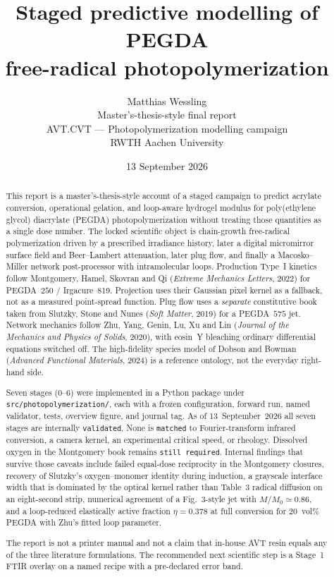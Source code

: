 \documentclass[11pt,a4paper,oneside]{report}
\title{Staged predictive modelling of PEGDA\\
free-radical photopolymerization}
\author{Matthias Wessling\\[0.4em]
{\large Master's-thesis-style final report}\\[0.3em]
{\normalsize AVT.CVT --- Photopolymerization modelling campaign}\\[0.2em]
{\normalsize RWTH Aachen University}}
\date{13 September 2026}
\begin{document}
\maketitle

\begin{abstract}
\noindent
This report is a master's-thesis-style account of a staged campaign to predict acrylate conversion, operational gelation, and loop-aware hydrogel modulus for poly(ethylene glycol) diacrylate (PEGDA) photopolymerization without treating those quantities as a single dose number.
The locked scientific object is chain-growth free-radical polymerization driven by a prescribed irradiance history, later a digital micromirror surface field and Beer--Lambert attenuation, later plug flow, and finally a Macosko--Miller network post-processor with intramolecular loops.
Production Type~I kinetics follow Montgomery, Hamel, Skovran and Qi (\emph{Extreme Mechanics Letters}, 2022) for PEGDA~$250$ / Irgacure~819.
Projection uses their Gaussian pixel kernel as a fallback, not as a measured point-spread function.
Plug flow uses a \emph{separate} constitutive book taken from Slutzky, Stone and Nunes (\emph{Soft Matter}, 2019) for a PEGDA~$575$ jet.
Network mechanics follow Zhu, Yang, Genin, Lu, Xu and Lin (\emph{Journal of the Mechanics and Physics of Solids}, 2020), with eosin~Y bleaching ordinary differential equations switched off.
The high-fidelity species model of Dobson and Bowman (\emph{Advanced Functional Materials}, 2024) is a reference ontology, not the everyday right-hand side.

Seven stages (0--6) were implemented in a Python package under \texttt{src/photopolymerization/}, each with a frozen configuration, forward run, named validator, tests, overview figure, and journal tag.
As of 13~September~2026 all seven stages are internally \texttt{validated}.
None is \texttt{matched} to Fourier-transform infrared conversion, a camera kernel, an experimental critical speed, or rheology.
Dissolved oxygen in the Montgomery book remains \texttt{still required}.
Internal findings that survive those caveats include failed equal-dose reciprocity in the Montgomery closures, recovery of Slutzky's oxygen--monomer identity during induction, a grayscale interface width that is dominated by the optical kernel rather than Table~3 radical diffusion on an eight-second strip, numerical agreement of a Fig.~3-style jet with $M/M_0\simeq0.86$, and a loop-reduced elastically active fraction $\eta=0.378$ at full conversion for 20~vol\% PEGDA with Zhu's fitted loop parameter.

The report is not a printer manual and not a claim that in-house AVT resin equals any of the three literature formulations.
The recommended next scientific step is a Stage~1 FTIR overlay on a named recipe with a pre-declared error band.
\end{abstract}

\tableofcontents
\listoffigures
\listoftables











\end{document}
